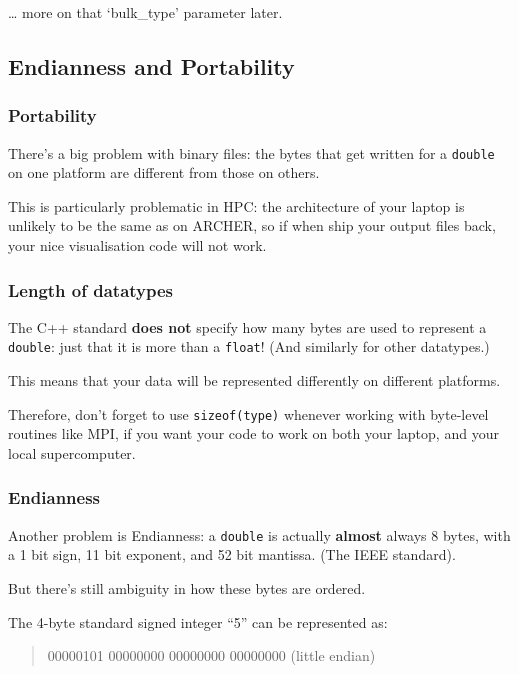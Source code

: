 \ldots{} more on that `bulk\_type' parameter later.

\subsection{Endianness and
Portability}\label{endianness-and-portability}

\subsubsection{Portability}\label{portability}

There's a big problem with binary files: the bytes that get written for
a \texttt{double} on one platform are different from those on others.

This is particularly problematic in HPC: the architecture of your laptop
is unlikely to be the same as on ARCHER, so if when ship your output
files back, your nice visualisation code will not work.

\subsubsection{Length of datatypes}\label{length-of-datatypes}

The C++ standard \textbf{does not} specify how many bytes are used to
represent a \texttt{double}: just that it is more than a \texttt{float}!
(And similarly for other datatypes.)

This means that your data will be represented differently on different
platforms.

Therefore, don't forget to use \texttt{sizeof(type)} whenever working
with byte-level routines like MPI, if you want your code to work on both
your laptop, and your local supercomputer.

\subsubsection{Endianness}\label{endianness}

Another problem is Endianness: a \texttt{double} is actually
\textbf{almost} always 8 bytes, with a 1 bit sign, 11 bit exponent, and
52 bit mantissa. (The IEEE standard).

But there's still ambiguity in how these bytes are ordered.

The 4-byte standard signed integer ``5'' can be represented as:

\begin{quote}
00000101 00000000 00000000 00000000 (little endian)
\end{quote}

